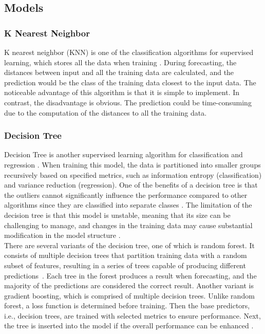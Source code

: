 \documentclass[12pt,twoside]{report}
\begin{document}
\subsection{Models}
\label{model_review}
\subsubsection{K Nearest Neighbor}
K nearest neighbor (KNN) is one of the classification algorithms for supervised learning, which stores all the data when training \citep{RN33}. During forecasting, the distances between input and all the training data are calculated, and the prediction would be the class of the training data closest to the input data. The noticeable advantage of this algorithm is that it is simple to implement. In contrast, the disadvantage is obvious. The prediction could be time-consuming due to the computation of the distances to all the training data. 

\subsubsection{Decision Tree}
Decision Tree is another supervised learning algorithm for classification and regression \citep{RN33}. When training this model,  the data is partitioned into smaller groups recursively based on specified metrics, such as information entropy (classification) and variance reduction (regression). One of the benefits of a decision tree is that the outliers cannot significantly influence the performance compared to other algorithms since they are classified into separate classes \citep{RN31}. The limitation of the decision tree is that this model is unstable, meaning that its size can be challenging to manage, and changes in the training data may cause substantial modification in the model structure \citep{RN33}. 
\\

There are several variants of the decision tree, one of which is random forest. It consists of multiple decision trees that partition training data with a random subset of features, resulting in a series of trees capable of producing different \mbox{predictions \citep{RN34}}. Each tree in the forest produces a result when forecasting, and the majority of the predictions are considered the correct result. Another variant is gradient boosting, which is comprised of multiple decision trees. Unlike random forest, a loss function is determined before training. Then the base predictors, i.e., decision trees, are trained with selected metrics to ensure performance. Next, the tree is inserted into the model if the overall performance can be enhanced \citep{RN35}. 
\end{document}
